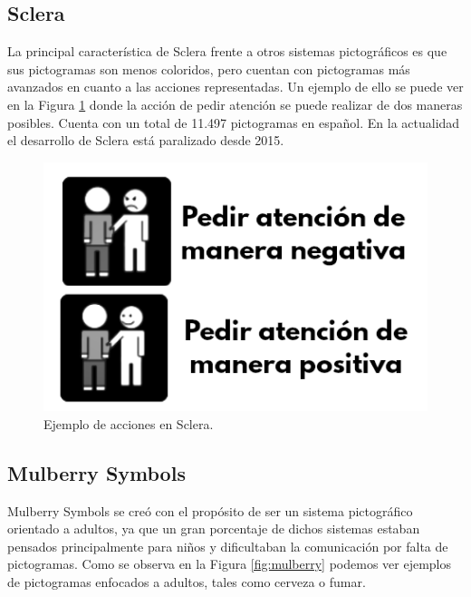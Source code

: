 \subsection{Sclera}
\label{cap2:sec:sclera}
La principal característica de Sclera \citep{sclera} frente a otros sistemas pictográficos es que sus pictogramas son menos coloridos, pero cuentan con pictogramas más avanzados en cuanto a las acciones representadas. Un ejemplo de ello se puede ver en la Figura \ref{fig:sclera} donde la acción de pedir atención se puede realizar de dos maneras posibles. Cuenta con un total de 11.497 pictogramas en español. En la actualidad el desarrollo de Sclera está paralizado desde 2015.



\begin{figure}[h!]
	\centering
	\includegraphics[scale=0.4]{Imagenes/Bitmap/Sclera}
	\caption{Ejemplo de acciones en Sclera.}
	\label{fig:sclera}
\end{figure}


\subsection{Mulberry Symbols}
\label{cap3:sec:mulberry}
Mulberry Symbols \citep{mulberry} se creó con el propósito de ser un sistema pictográfico orientado a adultos, ya que un gran porcentaje de dichos sistemas estaban pensados principalmente para niños y dificultaban la comunicación por falta de pictogramas. Como se observa en la Figura \ref{fig:mulberry} podemos ver ejemplos de pictogramas enfocados a adultos, tales como cerveza o fumar.


